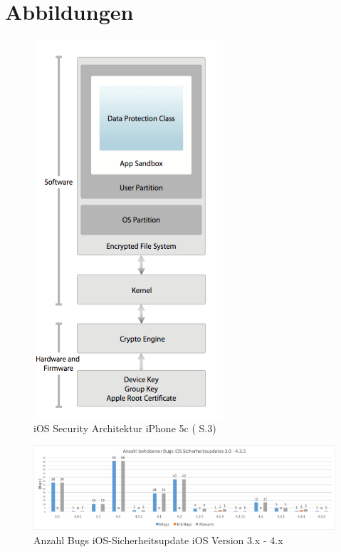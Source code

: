 \newpage
\chapter{Abbildungen}

\begin{figure}[htbp]
    \centering 
		        \includegraphics[scale=0.3]{Bilder/SecArchitektur-iOS7.png}
	\caption {iOS Security Architektur iPhone 5c (\cite{Apple[9]} S.3) } 
    \label{fig:iOSSecurityArchitekturiOS7}
\end{figure}

\begin{figure}[hp!]
        \centering
                \includegraphics[scale=0.4]{Bilder/iOSSicherheitsupdate3.png}
        \caption{ Anzahl Bugs iOS-Sicherheitsupdate iOS Version 3.x - 4.x  \protect\footnotemark}
        \label{fig:AnalyseiOSSicherheitsupdate3}
\end{figure}

